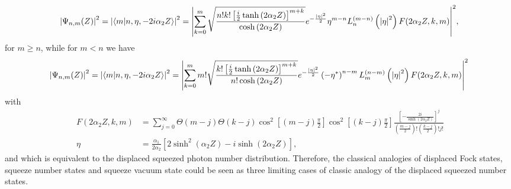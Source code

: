 \documentclass[12pt]{article}
\numberwithin{equation}{section}
\begin{document}
\begin{equation}
\abs{\Psi_{n,m}(Z)}^2 =\abs{\left\langle m| n,\eta,-2 i \alpha_{2} Z\right\rangle}^2=\abs{\sum_{k=0}^{m} \sqrt{\frac{n! k! \left[\frac{i}{2}\tanh\left(2\alpha_{2} Z \right)\right]^{m+k}}{\cosh\left(2\alpha_{2} Z\right)}} e^{-\frac{\abs{\eta}^2}{2}} \eta^{m-n} L_n^{\left(m-n \right) }\left( \abs{\eta}^2\right) F(2\alpha_{2} Z,k,m)}^2 ,
\end{equation}
for $m\geq n$, while for $m<n$ we have
\begin{equation}
\abs{\Psi_{n,m}(Z)}^2 =\abs{\left\langle m| n,\eta,-2 i \alpha_{2} Z\right\rangle}^2=\abs{\sum_{k=0}^{m} m! \sqrt{\frac{k! \left[\frac{i}{2} \tanh\left(2\alpha_{2} Z\right)\right]^{m+k}}{n! \cosh\left(2\alpha_{2} Z\right)}} e^{-\frac{\abs{\eta}^2}{2}} \left(-\eta^{*}\right)^{n-m} L_m^{\left(n-m \right) }\left( \abs{\eta}^2\right) F(2\alpha_{2} Z,k,m)}^2 
\end{equation}
with
\begin{subequations}\
\begin{align}
F(2\alpha_{2} Z,k,m)&=\sum_{j=0}^{\infty} \Theta\left(m-j \right)  \Theta\left(k-j \right) 
\cos^2\left[\left(m-j \right)\frac{\pi}{2}  \right] \cos^2\left[\left(k-j \right)\frac{\pi}{2}  \right] 
\frac{\left[ -\frac{2 i}{\sinh\left(2\alpha_{2} Z \right) } \right]^j }{\left(\frac{m-j}{2} \right) ! \left(\frac{k-j}{2} \right) ! j!}
\\ 
\eta&=\frac{\alpha_{1}}{2\alpha_{2}}\left[2 \sinh^2\left(\alpha_{2} Z\right)-i \sinh\left(2\alpha_{2} Z\right)\right],
\end{align}
\end{subequations}
and which is equivalent to the displaced squeezed photon number distribution\cite{29,30,31}. Therefore, the classical analogies of displaced Fock states, squeeze number states and squeeze vacuum state could be seen as three limiting cases of classic analogy of the displaced squeezed number states.
\end{document}
